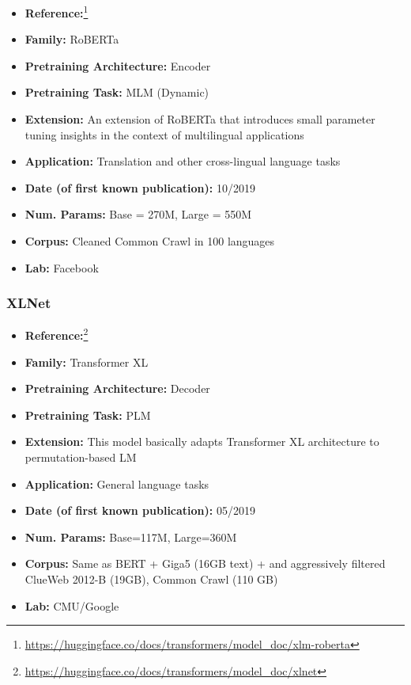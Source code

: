 \documentclass{article}
\begin{document}
            \begin{itemize}
                \item \textbf{Reference:}\footnote{\url{https://huggingface.co/docs/transformers/model_doc/xlm-roberta}}\cite{conneau2019unsupervised}
                \item \textbf{Family:} RoBERTa
                \item \textbf{Pretraining Architecture:} Encoder
                \item \textbf{Pretraining Task:} MLM (Dynamic)
                \item \textbf{Extension:} An extension of RoBERTa that introduces small parameter tuning insights in the context of multilingual applications
                \item \textbf{Application:} Translation and other cross-lingual language tasks
                \item \textbf{Date (of first known publication):} 10/2019
                \item \textbf{Num. Params:} Base = 270M, Large = 550M
                \item \textbf{Corpus:} Cleaned Common Crawl in 100 languages
                \item \textbf{Lab:} Facebook
            \end{itemize}

\subsubsection{XLNet}

            \begin{itemize}
                \item \textbf{Reference:}\footnote{\url{https://huggingface.co/docs/transformers/model_doc/xlnet}}\cite{yang2019xlnet}
                \item \textbf{Family:} Transformer XL
                \item \textbf{Pretraining Architecture:} Decoder
                \item \textbf{Pretraining Task:} PLM
                \item \textbf{Extension:} This model basically adapts Transformer XL architecture to permutation-based LM
                \item \textbf{Application:} General language tasks
                \item \textbf{Date (of first known publication):} 05/2019
                \item \textbf{Num. Params:} Base=117M, Large=360M
                \item \textbf{Corpus:} Same as BERT + Giga5 (16GB text) + and aggressively filtered ClueWeb 2012-B (19GB), Common Crawl (110 GB)
                \item \textbf{Lab:} CMU/Google
            \end{itemize}
\end{document}
